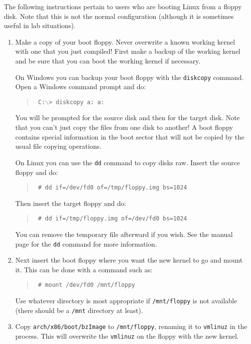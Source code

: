 \documentclass{article}
\newcommand{\command}[1]{\texttt{#1}}
\newcommand{\filename}[1]{\texttt{#1}}
\newenvironment{commands}
  {\begin{quote} \tt}
  {\end{quote}}
\begin{document}
The following instructions pertain to users who are booting Linux from a floppy disk. Note that
this is not the normal configuration (although it is sometimes useful in lab situations).

\begin{enumerate}

\item Make a copy of your boot floppy. Never overwrite a known working kernel with one that you
  just compiled! First make a backup of the working kernel and be sure that you can boot the
  working kernel if necessary.

  On Windows you can backup your boot floppy with the \command{diskcopy} command. Open a Windows
  command prompt and do:
  \begin{commands}
    C:$\backslash$> diskcopy a: a:
  \end{commands}

  You will be prompted for the source disk and then for the target disk. Note that you can't
  just copy the files from one disk to another! A boot floppy contains special information in
  the boot sector that will not be copied by the usual file copying operations.

  On Linux you can use the \command{dd} command to copy disks raw. Insert the source floppy and
  do:
  \begin{commands}
    \# dd if=/dev/fd0 of=/tmp/floppy.img bs=1024
  \end{commands}

  Then insert the target floppy and do:
  \begin{commands}
    \# dd if=/tmp/floppy.img of=/dev/fd0 bs=1024
  \end{commands}

  You can remove the temporary file afterward if you wish. See the manual page for the
  \command{dd} command for more information.

\item Next insert the boot floppy where you want the new kernel to go and mount it. This can be
  done with a command such as:
  \begin{commands}
    \# mount /dev/fd0 /mnt/floppy
  \end{commands}

  Use whatever directory is most appropriate if \filename{/mnt/floppy} is not available (there
  should be a \filename{/mnt} directory at least).

\item Copy \filename{arch/x86/boot/bzImage} to \filename{/mnt/floppy}, renaming it to
  \filename{vmlinuz} in the process. This will overwrite the \filename{vmlinuz} on the floppy
  with the new kernel.


\end{enumerate}
\end{document}
